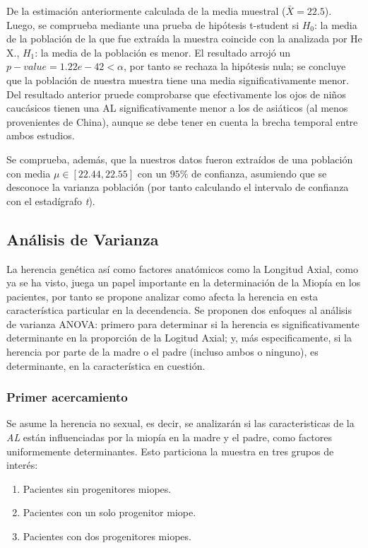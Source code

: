 \documentclass[a4paper,10pt,twocolumn]{article}
\begin{document}
	 De la estimación anteriormente calculada de la media muestral ($\bar{X} = 22.5 $). Luego, se comprueba mediante una prueba de hipótesis t-student si $H_0$: la media de la población de la que fue extraída la muestra coincide con la analizada por He X., $H_1$: la media de la población es menor. El resultado arrojó un $p-value = 1.22e-42 < \alpha$, por tanto se rechaza la hipótesis nula; se concluye que la población de nuestra muestra tiene una media significativamente menor. Del resultado anterior pruede comprobarse que efectivamente los ojos de niños caucásicos tienen una AL significativamente menor a los de asiáticos (al menos provenientes de China), aunque se debe tener en cuenta la brecha temporal entre ambos estudios.

	Se comprueba, además, que la nuestros datos fueron extraídos de una población con media $\mu \in [22.44, 22.55]$ con un $95\%$ de confianza, asumiendo que se desconoce la varianza población (por tanto calculando el intervalo de confianza con el estadígrafo \emph{t}).
	
\subsection{Análisis de Varianza}\label{sub:anova}
	La herencia genética así como factores anatómicos como la Longitud Axial, como ya se ha visto, juega un papel importante en la determinación de la Miopía en los pacientes, por tanto se propone analizar como afecta la herencia en esta característica particular en la decendencia. Se proponen dos enfoques al análisis de varianza ANOVA: primero para determinar si la herencia es significativamente determinante en la proporción de la Logitud Axial; y, más especificamente, si la herencia por parte de la madre o el padre (incluso ambos o ninguno), es determinante, en la característica en cuestión.
	
	\subsubsection{Primer acercamiento}
		Se asume la herencia no sexual, es decir, se analizarán si las caracteristicas de la \emph{AL} están influenciadas por la miopía en la madre y el padre, como factores uniformemente determinantes. Esto particiona la muestra en tres grupos de interés:
		
		\begin{enumerate}
			\item Pacientes sin progenitores miopes.
			\item Pacientes con un solo progenitor miope.
			\item Pacientes con dos progenitores miopes.
		\end{enumerate}
		
\end{document}
